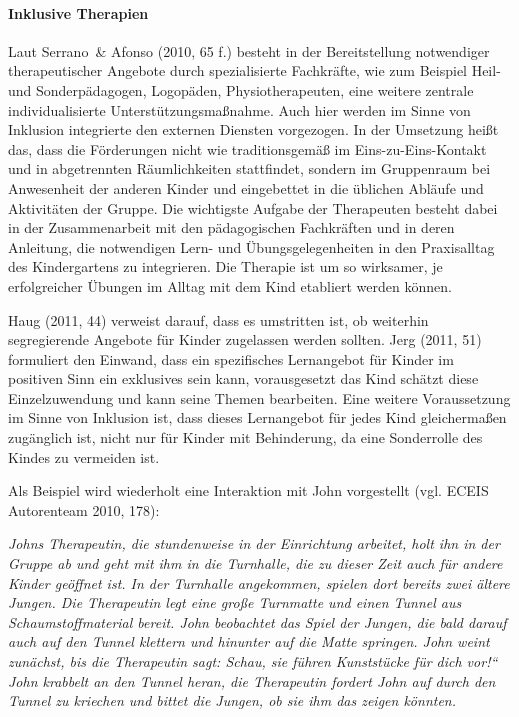 \paragraph{Inklusive Therapien} Laut Serrano~\& Afonso (2010, 65 f.) besteht in der Bereitstellung notwendiger therapeutischer Angebote durch spezialisierte Fachkräfte, wie zum Beispiel Heil- und Sonderpädagogen, Logopäden, Physiotherapeuten, eine weitere zentrale individualisierte Unterstützungsmaßnahme. Auch hier werden im Sinne von Inklusion integrierte den externen Diensten vorgezogen. In der Umsetzung heißt das, dass die Förderungen nicht wie traditionsgemäß im Eins-zu-Eins-Kontakt und in abgetrennten Räumlichkeiten stattfindet, sondern im Gruppenraum bei Anwesenheit der anderen Kinder und eingebettet in die üblichen Abläufe und Aktivitäten der Gruppe. Die wichtigste Aufgabe der Therapeuten besteht dabei in der Zusammenarbeit mit den pädagogischen Fachkräften und in deren Anleitung, die notwendigen Lern- und Übungsgelegenheiten in den Praxisalltag des Kindergartens zu integrieren. Die Therapie ist um so wirksamer, je erfolgreicher Übungen im Alltag mit dem Kind etabliert werden können.

Haug (2011, 44) verweist darauf, dass es umstritten ist, ob weiterhin segregierende Angebote für Kinder zugelassen werden sollten. Jerg (2011, 51) formuliert den Einwand, dass ein spezifisches Lernangebot für Kinder im positiven Sinn ein exklusives sein kann, vorausgesetzt das Kind schätzt diese Einzelzuwendung und kann seine Themen bearbeiten. Eine weitere Voraussetzung im Sinne von Inklusion ist, dass dieses Lernangebot für jedes Kind gleichermaßen zugänglich ist, nicht nur für Kinder mit Behinderung, da eine Sonderrolle des Kindes zu vermeiden ist. 

Als Beispiel wird wiederholt eine Interaktion mit John vorgestellt (vgl. ECEIS Autorenteam 2010, 178):

\emph{Johns Therapeutin, die stundenweise in der Einrichtung arbeitet, holt ihn in der Gruppe ab und geht mit ihm in die Turnhalle, die zu dieser Zeit auch für andere Kinder geöffnet ist. In der Turnhalle angekommen, spielen dort bereits zwei ältere Jungen. Die Therapeutin legt eine große Turnmatte und einen Tunnel aus Schaumstoffmaterial bereit. John beobachtet das Spiel der Jungen, die bald darauf auch auf den Tunnel klettern und hinunter auf die Matte springen. John weint zunächst, bis die Therapeutin sagt: Schau, sie führen Kunststücke für dich vor!“ John krabbelt an den Tunnel heran, die Therapeutin fordert John auf durch den Tunnel zu kriechen und bittet die Jungen, ob sie ihm das zeigen könnten.}

